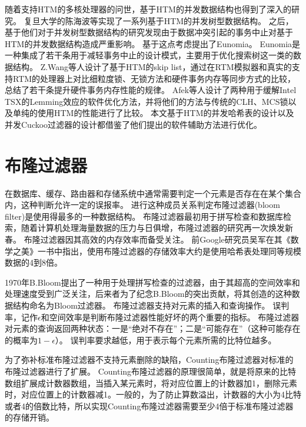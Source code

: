 随着支持HTM的多核处理器的问世，基于HTM的并发数据结构也得到了深入的研究。
复旦大学的陈海波等实现了一系列基于HTM的并发树型数据结构\cite{wang2014using,wei2015fast,chen2016fast}。
之后，基于他们对于并发树型数据结构的研究发现由于数据冲突引起的事务中止对基于HTM的并发数据结构造成严重影响。
基于这点考虑提出了Eunomia\cite{wang2017eunomia}。
Eunomia是一种集成了若干条用于减轻事务中止的设计模式，主要用于优化搜索树这一类的数据结构。
Z.Wang等人设计了基于HTM的skip list\cite{wang2013opportunities}，通过在RTM模拟器和真实的支持RTM的处理器上对比细粒度锁、无锁方法和硬件事务内存等同步方式的比较，总结了若干条提升硬件事务内存性能的规律。
Afek\cite{Afek2014Software}等人设计了两种用于缓解Intel TSX的Lemming效应的软件优化方法，并将他们的方法与传统的CLH、MCS锁以及单纯的使用HTM的性能进行了比较。
本文基于HTM的并发哈希表的设计以及并发Cuckoo过滤器的设计都借鉴了他们提出的软件辅助方法进行优化。

\section{布隆过滤器}

在数据库、缓存、路由器和存储系统中通常需要判定一个元素是否存在在某个集合内，这种判断允许一定的误报率。
进行这种成员关系判定布隆过滤器(bloom filter)是使用得最多的一种数据结构\cite{bloom1970space}。
布隆过滤器最初用于拼写检查和数据库检索，随着计算机处理海量数据的压力与日俱增，布隆过滤器的研究再一次焕发新春\cite{xiekun2009}。
布隆过滤器因其高效的内存效率而备受关注。
前Google研究员吴军\cite{吴军2012数学之美}在其《数学之美》一书中指出，使用布隆过滤器的存储效率大约是使用哈希表处理同等规模数据的4到8倍。

1970年B.Bloom\cite{bloom1970space}提出了一种用于处理拼写检查的过滤器，由于其超高的空间效率和处理速度受到广泛关注，后来者为了纪念B.Bloom的突出贡献，将其创造的这种数据结构命名为Bloom过滤器。
布隆过滤器支持对元素的插入和查询操作。
误判率，记作$\epsilon$和空间效率是判断布隆过滤器性能好坏的两个重要的指标。
布隆过滤器对元素的查询返回两种状态：一是“绝对不存在”；二是“可能存在”（这种可能存在的概率为$1-\epsilon$）。
误判率要求越低，用于表示每个元素所需的比特位越多。

为了弥补标准布隆过滤器不支持元素删除的缺陷，Counting布隆过滤器\cite{fan1998summary}对标准的布隆过滤器进行了扩展。
Counting布隆过滤器的原理很简单，就是将原来的比特数组扩展成计数器数组，当插入某元素时，将对应位置上的计数器加1，删除元素时，对应位置上的计数器减1。一般的，为了防止算数溢出，计数器的大小为4比特或者4的倍数比特，所以实现Counting布隆过滤器需要至少4倍于标准布隆过滤器的存储开销。

